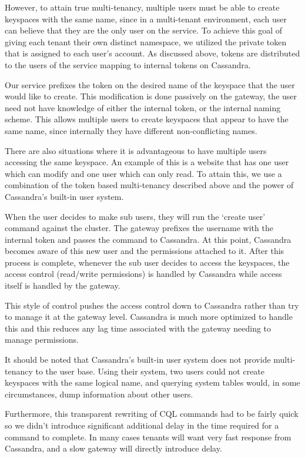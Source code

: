 \documentclass[11pt,notitlepage]{report}
\begin{document}
However, to attain true multi-tenancy, multiple users must be able to create keyspaces with the same name, since in a multi-tenant environment, each user can believe that they are the only user on the service. To achieve this goal of giving each tenant their own distinct namespace, we utilized the private token that is assigned to each user’s account. As discussed above, tokens are distributed to the users of the service mapping to internal tokens on Cassandra. 

Our service prefixes the token on the desired name of the keyspace that the user would like to create. This modification is done passively on the gateway, the user need not have knowledge of either the internal token, or the internal naming scheme. This allows multiple users to create keyspaces that appear to have the same name, since internally they have different non-conflicting names. 

There are also situations where it is advantageous to have multiple users accessing the same keyspace. An example of this is a website that has one user which can modify and one user which can only read. To attain this, we use a combination of the token based multi-tenancy described above and the power of Cassandra’s built-in user system. 

When the user decides to make sub users, they will run the ‘create user’ command against the cluster. The gateway prefixes the username with the internal token and passes the command to Cassandra. At this point, Cassandra becomes aware of this new user and the permissions attached to it. After this process is complete, whenever the sub user decides to access the keyspaces, the access control (read/write permissions) is handled by Cassandra while access itself is handled by the gateway. 

This style of control pushes the access control down to Cassandra rather than try to manage it at the gateway level. Cassandra is much more optimized to handle this and this reduces any lag time associated with the gateway needing to manage permissions. 

It should be noted that Cassandra’s built-in user system does not provide multi-tenancy to the user base. Using their system, two users could not create keyspaces with the same logical name, and querying system tables would, in some circumstances, dump information about other users. 

Furthermore, this transparent rewriting of CQL commands had to be fairly quick so we didn’t introduce significant additional delay in the time required for a command to complete. In many cases tenants will want very fast response from Cassandra, and a slow gateway will directly introduce delay.
\end{document}
